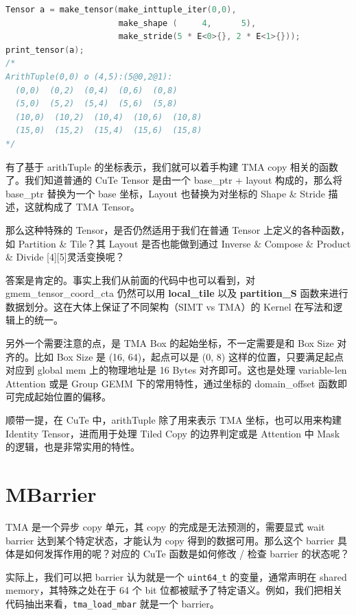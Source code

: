 \begin{lstlisting}[language=C++]
Tensor a = make_tensor(make_inttuple_iter(0,0),
                       make_shape (     4,      5),
                       make_stride(5 * E<0>{}, 2 * E<1>{}));
print_tensor(a);
/*
ArithTuple(0,0) o (4,5):(5@0,2@1):
  (0,0)  (0,2)  (0,4)  (0,6)  (0,8)
  (5,0)  (5,2)  (5,4)  (5,6)  (5,8)
  (10,0)  (10,2)  (10,4)  (10,6)  (10,8)
  (15,0)  (15,2)  (15,4)  (15,6)  (15,8)
*/
\end{lstlisting}

有了基于 arithTuple 的坐标表示，我们就可以着手构建 TMA copy 相关的函数了。我们知道普通的 CuTe Tensor 是由一个 base\_ptr + layout 构成的，那么将 base\_ptr 替换为一个 base 坐标，Layout 也替换为对坐标的 Shape \& Stride 描述，这就构成了 TMA Tensor。

那么这种特殊的 Tensor，是否仍然适用于我们在普通 Tensor 上定义的各种函数，如 Partition \& Tile？其 Layout 是否也能做到通过 Inverse \& Compose \& Product \& Divide [4][5]灵活变换呢？

答案是肯定的。事实上我们从前面的代码中也可以看到，对 gmem\_tensor\_coord\_cta 仍然可以用 \textbf{local\_tile} 以及 \textbf{partition\_S} 函数来进行数据划分。这在大体上保证了不同架构（SIMT vs TMA）的 Kernel 在写法和逻辑上的统一。

另外一个需要注意的点，是 TMA Box 的起始坐标，不一定需要是和 Box Size 对齐的。比如 Box Size 是 (16, 64)，起点可以是 (0, 8) 这样的位置，只要满足起点对应到 global mem 上的物理地址是 16 Bytes 对齐即可。这也是处理 variable-len Attention 或是 Group GEMM 下的常用特性，通过坐标的 domain\_offset 函数即可完成起始位置的偏移。

顺带一提，在 CuTe 中，arithTuple 除了用来表示 TMA 坐标，也可以用来构建 Identity Tensor，进而用于处理 Tiled Copy 的边界判定或是 Attention 中 Mask 的逻辑，也是非常实用的特性。

\section{MBarrier}

TMA 是一个异步 copy 单元，其 copy 的完成是无法预测的，需要显式 wait barrier 达到某个特定状态，才能认为 copy 得到的数据可用。那么这个 barrier 具体是如何发挥作用的呢？对应的 CuTe 函数是如何修改 / 检查 barrier 的状态呢？

实际上，我们可以把 barrier 认为就是一个 \verb|uint64_t| 的变量，通常声明在 shared memory，其特殊之处在于 64 个 bit 位都被赋予了特定语义。例如，我们把相关代码抽出来看，\verb|tma_load_mbar| 就是一个 barrier。

